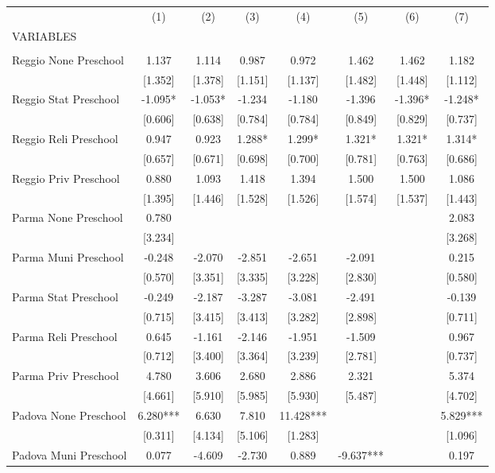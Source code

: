 \begin{tabular}{lccccccc} \hline
 & (1) & (2) & (3) & (4) & (5) & (6) & (7) \\
VARIABLES &  &  &  &  &  &  &  \\ \hline
 &  &  &  &  &  &  &  \\
Reggio None Preschool & 1.137 & 1.114 & 0.987 & 0.972 & 1.462 & 1.462 & 1.182 \\
 & [1.352] & [1.378] & [1.151] & [1.137] & [1.482] & [1.448] & [1.112] \\
Reggio Stat Preschool & -1.095* & -1.053* & -1.234 & -1.180 & -1.396 & -1.396* & -1.248* \\
 & [0.606] & [0.638] & [0.784] & [0.784] & [0.849] & [0.829] & [0.737] \\
Reggio Reli Preschool & 0.947 & 0.923 & 1.288* & 1.299* & 1.321* & 1.321* & 1.314* \\
 & [0.657] & [0.671] & [0.698] & [0.700] & [0.781] & [0.763] & [0.686] \\
Reggio Priv Preschool & 0.880 & 1.093 & 1.418 & 1.394 & 1.500 & 1.500 & 1.086 \\
 & [1.395] & [1.446] & [1.528] & [1.526] & [1.574] & [1.537] & [1.443] \\
Parma None Preschool & 0.780 &  &  &  &  &  & 2.083 \\
 & [3.234] &  &  &  &  &  & [3.268] \\
Parma Muni Preschool & -0.248 & -2.070 & -2.851 & -2.651 & -2.091 &  & 0.215 \\
 & [0.570] & [3.351] & [3.335] & [3.228] & [2.830] &  & [0.580] \\
Parma Stat Preschool & -0.249 & -2.187 & -3.287 & -3.081 & -2.491 &  & -0.139 \\
 & [0.715] & [3.415] & [3.413] & [3.282] & [2.898] &  & [0.711] \\
Parma Reli Preschool & 0.645 & -1.161 & -2.146 & -1.951 & -1.509 &  & 0.967 \\
 & [0.712] & [3.400] & [3.364] & [3.239] & [2.781] &  & [0.737] \\
Parma Priv Preschool & 4.780 & 3.606 & 2.680 & 2.886 & 2.321 &  & 5.374 \\
 & [4.661] & [5.910] & [5.985] & [5.930] & [5.487] &  & [4.702] \\
Padova None Preschool & 6.280*** & 6.630 & 7.810 & 11.428*** &  &  & 5.829*** \\
 & [0.311] & [4.134] & [5.106] & [1.283] &  &  & [1.096] \\
Padova Muni Preschool & 0.077 & -4.609 & -2.730 & 0.889 & -9.637*** &  & 0.197 \\

\end{tabular}
